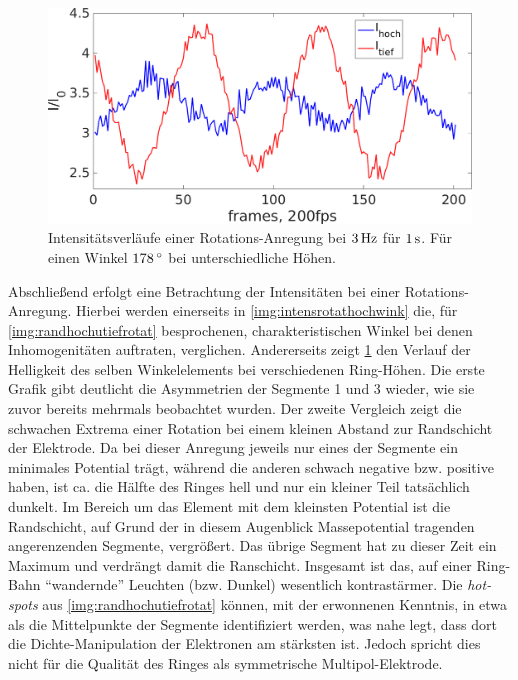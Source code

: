 \documentclass[numbers=noenddot,a4paper]{scrartcl}
\newcommand{\degree}{^\circ}
\newcommand{\tilt}[1]{\textit{#1}}
\begin{document}
						\begin{figure}[!b]
							\centering
							\includegraphics[width=\textwidth,height=0.6\textwidth]{figs/auswertung/intensrotathochutief1783Hz1sek.png}
						\caption{Intensitätsverläufe einer Rotations-Anregung bei $\unit[3]{Hz}$ für $\unit[1]{s}$. Für einen Winkel $\unit[178]{\degree}$ bei unterschiedliche Höhen.}\label{img:intensrotathochutief}
						\end{figure}

					Abschließend erfolgt eine Betrachtung der Intensitäten bei einer Rotations-Anregung. Hierbei werden einerseits in \ref{img:intensrotathochwink} die, für \ref{img:randhochutiefrotat} besprochenen, charakteristischen Winkel bei denen Inhomogenitäten auftraten, verglichen. Andererseits zeigt \ref{img:intensrotathochutief} den Verlauf der Helligkeit des selben Winkelelements bei verschiedenen Ring-Höhen. Die erste Grafik gibt deutlicht die Asymmetrien der Segmente 1 und 3 wieder, wie sie zuvor bereits mehrmals beobachtet wurden. Der zweite Vergleich zeigt die schwachen Extrema einer Rotation bei einem kleinen Abstand zur Randschicht der Elektrode. Da bei dieser Anregung jeweils nur eines der Segmente ein minimales Potential tr\"agt, w\"ahrend die anderen schwach negative bzw. positive haben, ist ca. die H\"alfte des Ringes hell und nur ein kleiner Teil tats\"achlich dunkelt. Im Bereich um das Element mit dem kleinsten Potential ist die Randschicht, auf Grund der in diesem Augenblick Massepotential tragenden angerenzenden Segmente, vergr\"o{\ss}ert. Das \"ubrige Segment hat zu dieser Zeit ein Maximum und verdr\"angt damit die Ranschicht. Insgesamt ist das, auf einer Ring-Bahn ``wandernde'' Leuchten (bzw. Dunkel) wesentlich kontrast\"armer. Die \tilt{hot-spots} aus \ref{img:randhochutiefrotat} k\"onnen, mit der erwonnenen Kenntnis, in etwa als die Mittelpunkte der Segmente identifiziert werden, was nahe legt, dass dort die Dichte-Manipulation der Elektronen am st\"arksten ist. Jedoch spricht dies nicht f\"ur die Qualit\"at des Ringes als symmetrische Multipol-Elektrode.
\end{document}
